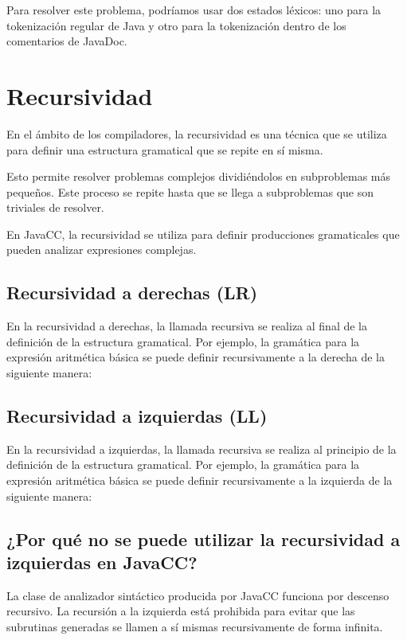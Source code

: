 Para resolver este problema, podríamos usar dos estados léxicos: uno para la tokenización regular de Java y otro para la tokenización dentro de los comentarios de JavaDoc.

\section{Recursividad}

\noindent En el ámbito de los compiladores, la recursividad es una técnica que se utiliza para definir una estructura gramatical que se repite en sí misma.

Esto permite resolver problemas complejos dividiéndolos en subproblemas más pequeños. Este proceso se repite hasta que se llega a subproblemas que son triviales de resolver.

En JavaCC, la recursividad se utiliza para definir producciones gramaticales que pueden analizar expresiones complejas.

\subsection{Recursividad a derechas (LR)}
\noindent En la recursividad a derechas, la llamada recursiva se realiza al final de la definición de la estructura gramatical. Por ejemplo, la gramática para la expresión aritmética básica se puede definir recursivamente a la derecha de la siguiente manera:

\lstset{inputencoding=utf8/latin1}


\subsection{Recursividad a izquierdas (LL)}

\noindent En la recursividad a izquierdas, la llamada recursiva se realiza al principio de la definición de la estructura gramatical. Por ejemplo, la gramática para la expresión aritmética básica se puede definir recursivamente a la izquierda de la siguiente manera:

\lstset{inputencoding=utf8/latin1}


\subsection{¿Por qué no se puede utilizar la recursividad a izquierdas en JavaCC?}
\noindent La clase de analizador sintáctico producida por JavaCC funciona por descenso recursivo. La recursión a la izquierda está prohibida para evitar que las subrutinas generadas se llamen a sí mismas recursivamente de forma infinita.

